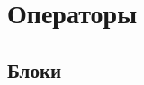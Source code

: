 \hypertarget{statements}{%
\section{Операторы}\label{stmt:chapter}}

\hypertarget{blocks}{%
\subsection{Блоки}\label{stmt:blocks}}

